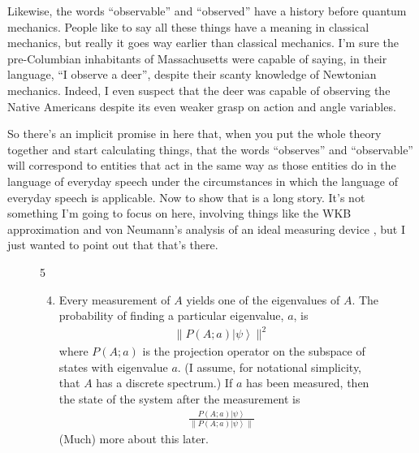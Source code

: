 \documentclass[12pt,nofootinbib]{revtex4}
\newcommand{\ket}[1]{\left|#1\right\rangle}
\begin{document}
Likewise, the words ``observable'' and ``observed'' have a history before quantum mechanics. People like to say all these things have a meaning in classical mechanics, but really it goes way earlier than classical mechanics. I'm sure the pre-Columbian inhabitants of Massachusetts were capable of saying, in their language, ``I observe a deer'', despite their scanty knowledge of Newtonian mechanics. Indeed, I even suspect that the deer was capable of observing the Native Americans despite its even weaker grasp on action and angle variables.

So there's an implicit promise in here that, when you put the whole theory together and start calculating things, that the words ``observes'' and ``observable'' will correspond to entities that act in the same way as those entities do in the language of everyday speech under the circumstances in which the language of everyday speech is applicable. Now to show that is a long story. It's not something I'm going to focus on here, involving things like the WKB approximation and von Neumann's analysis of an ideal measuring device \cite{Neumann32}, but I just wanted to point out that that's there.

\begin{figure}[htb] 
\begin{mdframed}
  \vspace{5pt}\hfill 5\\[-18pt]
  \begin{raggedright}
  \begin{enumerate}[label=(\roman*)]
    \setcounter{enumi}{3}
  \item Every measurement of $A$ yields one of the eigenvalues of $A$.  The probability of finding a particular eigenvalue, $a$, is 
    \begin{align}
      \nonumber
      \lVert P(A;a)\ket{\psi}\rVert^2
    \end{align}
    where $P(A;a)$ is the projection operator on the subspace of states with eigenvalue $a$. (I assume, for notational simplicity, that $A$ has a discrete spectrum.) If $a$ has been measured, then the state of the system after the measurement is
    \begin{align}
      \nonumber
      \frac{P(A;a)\ket{\psi}}{\lVert P(A;a)\ket{\psi}\rVert}
    \end{align}
    (Much) more about this later.
  \end{enumerate}
  \end{raggedright}
  \vspace{6pt}
\end{mdframed}
\end{figure}
\end{document}
